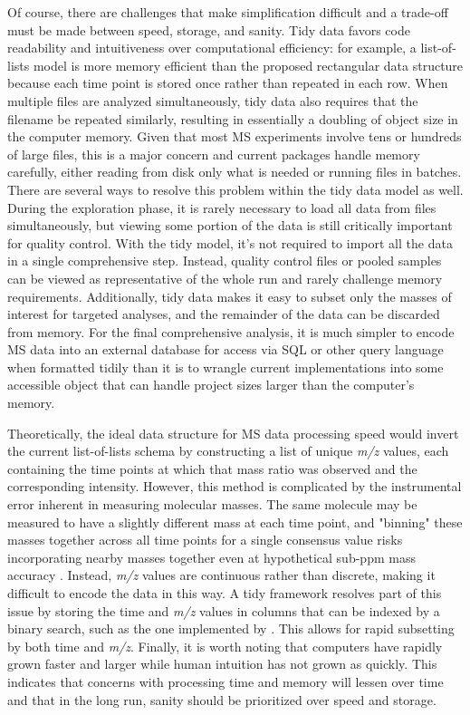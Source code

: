 Of course, there are challenges that make simplification difficult and a trade-off must be made between speed, storage, and sanity. Tidy data favors code readability and intuitiveness over computational efficiency: for example, a list-of-lists model is more memory efficient than the proposed rectangular data structure because each time point is stored once rather than repeated in each row. When multiple files are analyzed simultaneously, tidy data also requires that the filename be repeated similarly, resulting in essentially a doubling of object size in the computer memory. Given that most MS experiments involve tens or hundreds of large files, this is a major concern and current packages handle memory carefully, either reading from disk only what is needed or running files in batches. There are several ways to resolve this problem within the tidy data model as well. During the exploration phase, it is rarely necessary to load all data from files simultaneously, but viewing some portion of the data is still critically important for quality control. With the tidy model, it's not required to import all the data in a single comprehensive step. Instead, quality control files or pooled samples can be viewed as representative of the whole run and rarely challenge memory requirements. Additionally, tidy data makes it easy to subset only the masses of interest for targeted analyses, and the remainder of the data can be discarded from memory. For the final comprehensive analysis, it is much simpler to encode MS data into an external database for access via SQL or other query language when formatted tidily than it is to wrangle current implementations into some accessible object that can handle project sizes larger than the computer's memory.

Theoretically, the ideal data structure for MS data processing speed would invert the current list-of-lists schema by constructing a list of unique \emph{m/z} values, each containing the time points at which that mass ratio was observed and the corresponding intensity. However, this method is complicated by the instrumental error inherent in measuring molecular masses. The same molecule may be measured to have a slightly different mass at each time point, and "binning" these masses together across all time points for a single consensus value risks incorporating nearby masses together even at hypothetical sub-ppm mass accuracy \citep{kind2006}. Instead, \emph{m/z} values are continuous rather than discrete, making it difficult to encode the data in this way. A tidy framework resolves part of this issue by storing the time and \emph{m/z} values in columns that can be indexed by a binary search, such as the one implemented by . This allows for rapid subsetting by both time and \emph{m/z}. Finally, it is worth noting that computers have rapidly grown faster and larger while human intuition has not grown as quickly. This indicates that concerns with processing time and memory will lessen over time and that in the long run, sanity should be prioritized over speed and storage.

